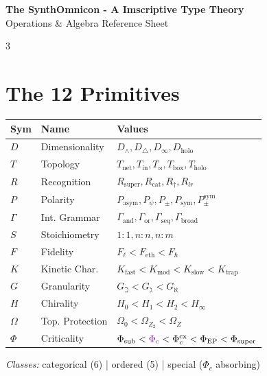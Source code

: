 \documentclass[8pt,a4paper,landscape]{article}
\newcommand{\cat}[1]{\textcolor{catblue}{#1}}
\newcommand{\ord}[1]{\textcolor{ordgreen}{#1}}
\newcommand{\spec}[1]{\textcolor{specpurple}{#1}}
\begin{document}
\begin{center}
\LARGE\textbf{The SynthOmnicon - A Imscriptive Type Theory}\\
\normalsize Operations \& Algebra Reference Sheet
\end{center}
\vspace{-0.3em}

\begin{multicols}{3}

\section*{The 12 Primitives}
\footnotesize
\renewcommand{\arraystretch}{1.1}
\begin{tabular}{@{}llp{3.8cm}@{}}
\toprule
\textbf{Sym} & \textbf{Name} & \textbf{Values} \\
\midrule
\cat{$D$} & Dimensionality & $D_\wedge,D_\triangle,D_\infty,D_{\text{holo}}$ \\
\cat{$T$} & Topology & $T_{\text{net}},T_{\text{in}},T_\bowtie,T_{\text{box}},T_{\text{holo}}$ \\
\cat{$R$} & Recognition & $R_{\text{super}},R_{\text{cat}},R_\dagger,R_{lr}$ \\
\cat{$P$} & Polarity & $P_{\text{asym}},P_\psi,P_\pm,P_{\text{sym}},P_\pm^{\text{sym}}$ \\
\cat{$\Gamma$} & Int. Grammar & $\Gamma_{\text{and}},\Gamma_{\text{or}},\Gamma_{\text{seq}},\Gamma_{\text{broad}}$ \\
\cat{$S$} & Stoichiometry & $1{:}1,n{:}n,n{:}m$ \\
\midrule
\ord{$F$} & Fidelity & $F_\ell<F_{\text{eth}}<F_\hbar$ \\
\ord{$K$} & Kinetic Char. & $K_{\text{fast}}<K_{\text{mod}}<K_{\text{slow}}<K_{\text{trap}}$ \\
\ord{$G$} & Granularity & $G_\beth<G_\gimel<G_\aleph$ \\
\ord{$H$} & Chirality & $H_0<H_1<H_2<H_\infty$ \\
\ord{$\Omega$} & Top. Protection & $\Omega_0<\Omega_{Z_2}<\Omega_Z$ \\
\midrule
\spec{$\Phi$} & Criticality & $\Phi_{\text{sub}}<\spec{\Phi_c}<\Phi_c^{\text{cx}}<\Phi_{\text{EP}}<\Phi_{\text{super}}$ \\
\bottomrule
\end{tabular}
\renewcommand{\arraystretch}{1.0}

\vspace{0.6em}
\textit{Classes:} \cat{categorical (6)} | \ord{ordered (5)} | \spec{special ($\Phi_c$ absorbing)}


\end{multicols}
\end{document}

